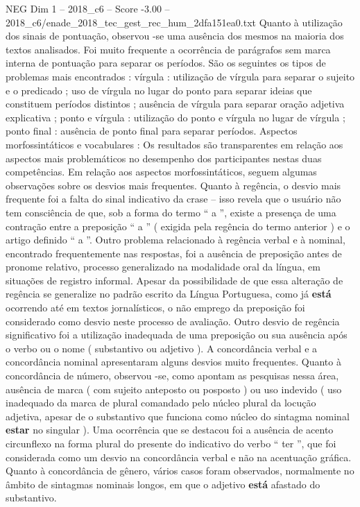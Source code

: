 \begin{textsample}{NEG Dim 1 – 2018\_c6 – Score -3.00 – 2018\_c6/enade\_2018\_tec\_gest\_rec\_hum\_2dfa151ea0.txt}
Quanto à utilização dos sinais de pontuação, observou -se uma ausência dos mesmos na maioria dos textos analisados.
Foi muito frequente a ocorrência de parágrafos sem marca interna de pontuação para separar os períodos.
São os seguintes os tipos de problemas mais encontrados : vírgula : utilização de vírgula para separar o sujeito e o predicado ; uso de vírgula no lugar do ponto para separar ideias que constituem períodos distintos ; ausência de vírgula para separar oração adjetiva explicativa ; ponto e vírgula : utilização do ponto e vírgula no lugar de vírgula ; ponto final : ausência de ponto final para separar períodos.
Aspectos morfossintáticos e vocabulares : Os resultados são transparentes em relação aos aspectos mais problemáticos no desempenho dos participantes nestas duas competências.
Em relação aos aspectos morfossintáticos, seguem algumas observações sobre os desvios mais frequentes.
Quanto à regência, o desvio mais frequente foi a falta do sinal indicativo da crase – isso revela que o usuário não tem consciência de que, sob a forma do termo “ a ”, existe a presença de uma contração entre a preposição “ a ” ( exigida pela regência do termo anterior ) e o artigo definido “ a ”.
Outro problema relacionado à regência verbal e à nominal, encontrado frequentemente nas respostas, foi a ausência de preposição antes de pronome relativo, processo generalizado na modalidade oral da língua, em situações de registro informal.
Apesar da possibilidade de que essa alteração de regência se generalize no padrão escrito da Língua Portuguesa, como já \textbf{está} ocorrendo até em textos jornalísticos, o não emprego da preposição foi considerado como desvio neste processo de avaliação.
Outro desvio de regência significativo foi a utilização inadequada de uma preposição ou sua ausência após o verbo ou o nome ( substantivo ou adjetivo ).
A concordância verbal e a concordância nominal apresentaram alguns desvios muito frequentes.
Quanto à concordância de número, observou -se, como apontam as pesquisas nessa área, ausência de marca ( com sujeito anteposto ou posposto ) ou uso indevido ( uso inadequado da marca de plural comandado pelo núcleo plural da locução adjetiva, apesar de o substantivo que funciona como núcleo do sintagma nominal \textbf{estar} no singular ).
Uma ocorrência que se destacou foi a ausência de acento circunflexo na forma plural do presente do indicativo do verbo “ ter ”, que foi considerada como um desvio na concordância verbal e não na acentuação gráfica.
Quanto à concordância de gênero, vários casos foram observados, normalmente no âmbito de sintagmas nominais longos, em que o adjetivo \textbf{está} afastado do substantivo.

\end{textsample}
